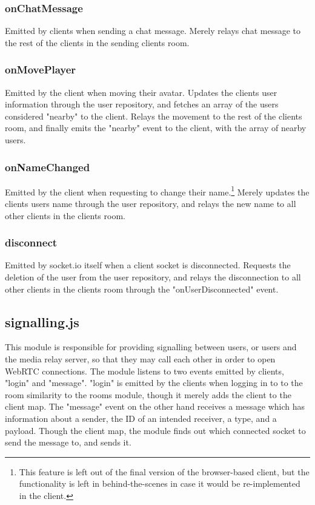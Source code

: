 \subsubsection{onChatMessage}

Emitted by clients when sending a chat message. Merely relays chat message to the rest of the clients in the sending clients room.

\subsubsection{onMovePlayer}

Emitted by the client when moving their avatar. Updates the clients user information through the user repository, and fetches an array of the users considered "nearby" to the client. Relays the movement to the rest of the clients room, and finally emits the "nearby" event to the client, with the array of nearby users.

\subsubsection{onNameChanged}

Emitted by the client when requesting to change their name.\footnote{This feature is left out of the final version of the browser-based client, but the functionality is left in behind-the-scenes in case it would be re-implemented in the client.} Merely updates the clients users name through the user repository, and relays the new name to all other clients in the clients room.

\subsubsection{disconnect}

Emitted by socket.io itself when a client socket is disconnected. Requests the deletion of the user from the user repository, and relays the disconnection to all other clients in the clients room through the "onUserDisconnected" event.

\subsection{signalling.js}

This module is responsible for providing signalling between users, or users and the media relay server, so that they may call each other in order to open WebRTC connections. The module listens to two events emitted by clients, "login" and "message". "login" is emitted by the clients when logging in to to the room similarity to the rooms module, though it merely adds the client to the client map. The "message" event on the other hand receives a message which has information about a sender, the ID of an intended receiver, a type, and a payload. Though the client map, the module finds out which connected socket to send the message to, and sends it.

